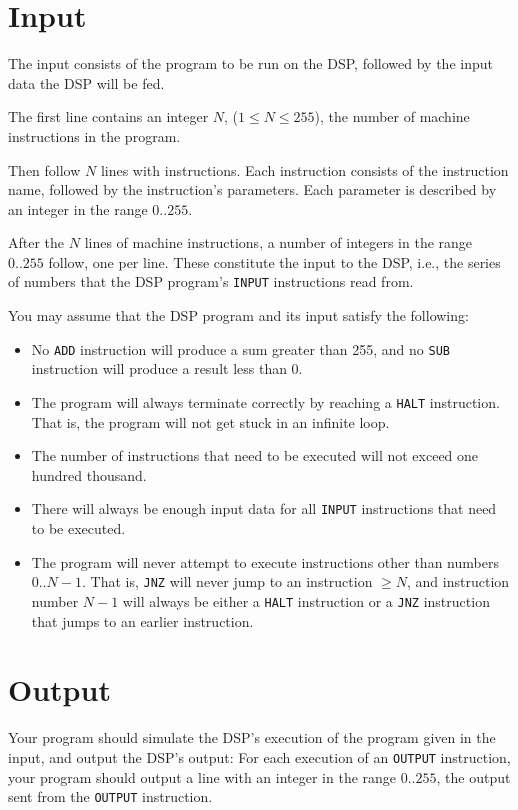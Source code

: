 \section*{Input}
The input consists of the program to be run on the DSP, followed by the input data the DSP will be fed.

The first line contains an integer $N$, ($1 \leq N \leq 255$), the number of machine instructions in the program.

Then follow $N$ lines with instructions. Each instruction consists of the instruction name, followed by the instruction's parameters. Each parameter is described by an integer in the range $0..255$.

After the $N$ lines of machine instructions, a number of integers in the range $0..255$ follow, one per line.
These constitute the input to the DSP, i.e., the series of numbers that the DSP program's \texttt{INPUT} instructions read from.

You may assume that the DSP program and its input satisfy the following:
\begin{itemize}
\item No \texttt{ADD} instruction will produce a sum greater than 255, and no \texttt{SUB} instruction will produce a result less than 0.
\item The program will always terminate correctly by reaching a \texttt{HALT} instruction. That is, the program will not get stuck in an infinite loop.
\item The number of instructions that need to be executed will not exceed one hundred thousand.
\item There will always be enough input data for all \texttt{INPUT} instructions that need to be executed.
\item The program will never attempt to execute instructions other than numbers $0..N-1$. That is, \texttt{JNZ} will never jump to an instruction $\ge N$, and instruction number $N-1$ will always be either a \texttt{HALT} instruction or a \texttt{JNZ} instruction that jumps to an earlier instruction.
\end{itemize}

\section*{Output}
Your program should simulate the DSP's execution of the program given in the input, and output the DSP's output: For each execution of an \texttt{OUTPUT} instruction, your program should output a line with an integer in the range $0..255$, the output sent from the \texttt{OUTPUT} instruction.

